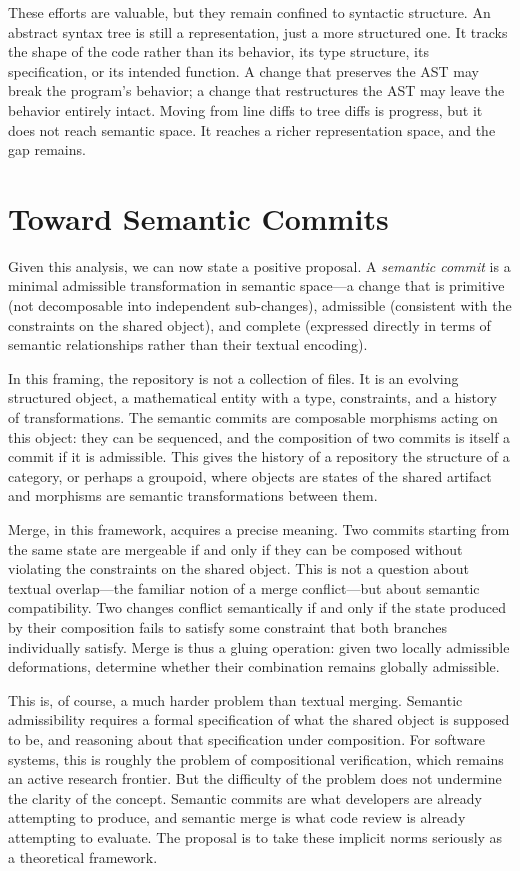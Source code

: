 \documentclass[12pt, letterpaper]{article}
\begin{document}
These efforts are valuable, but they remain confined to syntactic structure. An abstract syntax tree is still a representation, just a more structured one. It tracks the shape of the code rather than its behavior, its type structure, its specification, or its intended function. A change that preserves the AST may break the program's behavior; a change that restructures the AST may leave the behavior entirely intact. Moving from line diffs to tree diffs is progress, but it does not reach semantic space. It reaches a richer representation space, and the gap remains.

\section{Toward Semantic Commits}

Given this analysis, we can now state a positive proposal. A \emph{semantic commit} is a minimal admissible transformation in semantic space---a change that is primitive (not decomposable into independent sub-changes), admissible (consistent with the constraints on the shared object), and complete (expressed directly in terms of semantic relationships rather than their textual encoding).

In this framing, the repository is not a collection of files. It is an evolving structured object, a mathematical entity with a type, constraints, and a history of transformations. The semantic commits are composable morphisms acting on this object: they can be sequenced, and the composition of two commits is itself a commit if it is admissible. This gives the history of a repository the structure of a category, or perhaps a groupoid, where objects are states of the shared artifact and morphisms are semantic transformations between them.

Merge, in this framework, acquires a precise meaning. Two commits starting from the same state are mergeable if and only if they can be composed without violating the constraints on the shared object. This is not a question about textual overlap---the familiar notion of a merge conflict---but about semantic compatibility. Two changes conflict semantically if and only if the state produced by their composition fails to satisfy some constraint that both branches individually satisfy. Merge is thus a gluing operation: given two locally admissible deformations, determine whether their combination remains globally admissible.

This is, of course, a much harder problem than textual merging. Semantic admissibility requires a formal specification of what the shared object is supposed to be, and reasoning about that specification under composition. For software systems, this is roughly the problem of compositional verification, which remains an active research frontier. But the difficulty of the problem does not undermine the clarity of the concept. Semantic commits are what developers are already attempting to produce, and semantic merge is what code review is already attempting to evaluate. The proposal is to take these implicit norms seriously as a theoretical framework.
\end{document}
